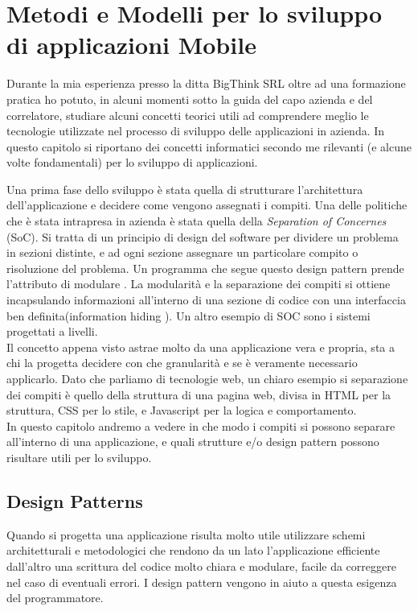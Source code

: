 \chapter{Metodi e Modelli per lo sviluppo di applicazioni Mobile}
Durante la mia esperienza presso la ditta BigThink SRL oltre ad una formazione pratica ho potuto, in alcuni momenti sotto la guida del capo azienda e del correlatore, studiare alcuni concetti teorici utili ad comprendere meglio le tecnologie utilizzate nel processo di sviluppo delle applicazioni in azienda. In questo capitolo si riportano dei concetti informatici secondo me rilevanti (e alcune volte fondamentali) per lo sviluppo di applicazioni.

Una prima fase dello sviluppo è stata quella di strutturare l'architettura dell'applicazione e decidere come vengono assegnati i compiti. Una delle politiche che è stata intrapresa in azienda è stata quella della \emph{Separation of Concernes} (SoC). Si tratta di un principio di design del software per dividere un problema in sezioni distinte, e ad ogni sezione assegnare un particolare compito o risoluzione del problema. Un programma che segue questo design pattern prende l'attributo di modulare \cite{book:laplante2007every}. La modularità e la separazione dei compiti si ottiene incapsulando informazioni all'interno di una sezione di codice con una interfaccia ben definita(information hiding \cite{book:mitchell1990managing}). Un altro esempio di SOC sono i sistemi progettati a livelli. \cite{wiki:soc}\\

Il concetto appena visto astrae molto da una applicazione vera e propria, sta a chi la progetta decidere con che granularità  e se è veramente necessario applicarlo. Dato che parliamo di tecnologie web, un chiaro esempio si separazione dei compiti è quello della struttura di una pagina web, divisa in HTML per la struttura, CSS per lo stile, e Javascript per la logica e comportamento.\\

In questo capitolo andremo a vedere in che modo i compiti si possono separare all'interno di una applicazione, e quali strutture e/o design pattern possono risultare utili per lo sviluppo.
 
\section{Design Patterns}

Quando si progetta una applicazione risulta molto utile utilizzare schemi architetturali e metodologici che rendono da un lato l'applicazione efficiente dall'altro una scrittura del codice molto chiara e modulare, facile da correggere nel caso di eventuali errori. I design pattern vengono in aiuto a questa esigenza del programmatore.

